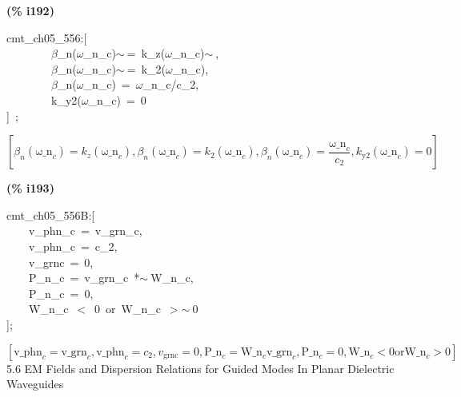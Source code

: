 \documentclass[fleqn]{article}
\begin{document}
\noindent
\begin{minipage}[t]{4.000000em}\color{red}\bfseries
(\% i192)	
\end{minipage}
\begin{minipage}[t]{\textwidth}\color{blue}
cmt\_ch05\_556:[\\
\ \ \ \ \ \ \ \ \ensuremath{\beta}\_n(\ensuremath{\omega}\_n\_c)\ensuremath{\sim\ }=\ k\_z(\ensuremath{\omega}\_n\_c)\ensuremath{\sim\ },\\
\ \ \ \ \ \ \ \ \ensuremath{\beta}\_n(\ensuremath{\omega}\_n\_c)\ensuremath{\sim\ }=\ k\_2(\ensuremath{\omega}\_n\_c),\\
\ \ \ \ \ \ \ \ \ensuremath{\beta}\_n(\ensuremath{\omega}\_n\_c)\ =\ \ensuremath{\omega}\_n\_c/c\_2,\\
\ \ \ \ \ \ \ \ k\_y2(\ensuremath{\omega}\_n\_c)\ =\ 0\\
]\ ;
\end{minipage}
\[\displaystyle \tag{\% o192} 
\operatorname{[}{{\beta }_n}\left( {{\ensuremath{\mathrm{\omega \_ n}}}_c}\right) ={k_z}\left( {{\ensuremath{\mathrm{\omega \_ n}}}_c}\right) \operatorname{,}{{\beta }_n}\left( {{\ensuremath{\mathrm{\omega \_ n}}}_c}\right) ={k_2}\left( {{\ensuremath{\mathrm{\omega \_ n}}}_c}\right) \operatorname{,}{{\beta }_n}\left( {{\ensuremath{\mathrm{\omega \_ n}}}_c}\right) =\frac{{{\ensuremath{\mathrm{\omega \_ n}}}_c}}{{c_2}}\operatorname{,}{k_{\ensuremath{\mathrm{y2}}}}\left( {{\ensuremath{\mathrm{\omega \_ n}}}_c}\right) =0\operatorname{]}\mbox{}
\]


\noindent
\begin{minipage}[t]{4.000000em}\color{red}\bfseries
(\% i193)	
\end{minipage}
\begin{minipage}[t]{\textwidth}\color{blue}
cmt\_ch05\_556B:[\\
\ \ \ \ v\_phn\_c\ =\ v\_grn\_c,\\
\ \ \ \ v\_phn\_c\ =\ c\_2,\\
\ \ \ \ v\_grnc\ =\ 0,\\
\ \ \ \ P\_n\_c\ =\ v\_grn\_c\ *\ensuremath{\sim\ }W\_n\_c,\ \\
\ \ \ \ P\_n\_c\ =\ 0,\\
\ \ \ \ W\_n\_c\ \ensuremath{<}\ 0\ or\ W\_n\_c\ \ensuremath{>}\ensuremath{\sim\ }0\\
];
\end{minipage}
\[\displaystyle \tag{\% o193} 
\operatorname{[}{{\ensuremath{\mathrm{v\_ phn}}}_c}={{\ensuremath{\mathrm{v\_ grn}}}_c}\operatorname{,}{{\ensuremath{\mathrm{v\_ phn}}}_c}={c_2}\operatorname{,}{v_{\ensuremath{\mathrm{grnc}}}}=0\operatorname{,}{{\ensuremath{\mathrm{P\_ n}}}_c}={{\ensuremath{\mathrm{W\_ n}}}_c} {{\ensuremath{\mathrm{v\_ grn}}}_c}\operatorname{,}{{\ensuremath{\mathrm{P\_ n}}}_c}=0\operatorname{,}{{\ensuremath{\mathrm{W\_ n}}}_c}\operatorname{<  }0\ensuremath{\mathrm{ or 
}}{{\ensuremath{\mathrm{W\_ n}}}_c}\operatorname{>  }0\operatorname{]}\mbox{}
\]
5.6 EM Fields and Dispersion Relations for Guided Modes In Planar Dielectric Waveguides
\end{document}

